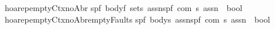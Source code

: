 \begin{isabellebody}
\isanewline
{\isachardoublequoteopen}{\isacharunderscore}hoarep{\isacharunderscore}emptyCtx{\isacharunderscore}noAbr{\isachardoublequoteclose}{\isacharcolon}{\isacharcolon}\isanewline
{\isachardoublequoteopen}{\isacharbrackleft}{\isacharparenleft}{\isacharprime}s{\isacharcomma}{\isacharprime}p{\isacharcomma}{\isacharprime}f{\isacharparenright}\ body{\isacharcomma}{\isacharprime}f\ set{\isacharcomma}{\isacharprime}s\ assn{\isacharcomma}{\isacharparenleft}{\isacharprime}s{\isacharcomma}{\isacharprime}p{\isacharcomma}{\isacharprime}f{\isacharparenright}\ com{\isacharcomma}\ {\isacharprime}s\ assn{\isacharbrackright}\ {\isacharequal}{\isachargreater}\ bool{\isachardoublequoteclose}\isanewline
\ \ \ {\isacharparenleft}{\isachardoublequoteopen}{\isacharparenleft}{}{\isacharunderscore}{\isacharslash}{\isacharbar}{\isacharminus}{\isacharprime}{\isacharslash}{\isacharunderscore}\ {\isacharparenleft}{\isacharunderscore}{\isacharslash}\ {\isacharparenleft}{\isacharunderscore}{\isacharparenright}{\isacharslash}\ {\isacharunderscore}{\isacharparenright}{\isacharparenright}{\isachardoublequoteclose}\ {\isacharbrackleft}{}{}{\isacharcomma}{}{}{\isacharcomma}{}{}{}{}{\isacharcomma}{}{}{\isacharcomma}{}{}{}{}{\isacharbrackright}{}{}{\isacharparenright}\isanewline
\isanewline
{\isachardoublequoteopen}{\isacharunderscore}hoarep{\isacharunderscore}emptyCtx{\isacharunderscore}noAbr{\isacharunderscore}emptyFaults{\isachardoublequoteclose}{\isacharcolon}{\isacharcolon}\isanewline
{\isachardoublequoteopen}{\isacharbrackleft}{\isacharparenleft}{\isacharprime}s{\isacharcomma}{\isacharprime}p{\isacharcomma}{\isacharprime}f{\isacharparenright}\ body{\isacharcomma}{\isacharprime}s\ assn{\isacharcomma}{\isacharparenleft}{\isacharprime}s{\isacharcomma}{\isacharprime}p{\isacharcomma}{\isacharprime}f{\isacharparenright}\ com{\isacharcomma}\ {\isacharprime}s\ assn{\isacharbrackright}\ {\isacharequal}{\isachargreater}\ bool{\isachardoublequoteclose}\isanewline
\ \ \ {\isacharparenleft}{\isachardoublequoteopen}{\isacharparenleft}{}{\isacharunderscore}{\isacharslash}{\isacharbar}{\isacharminus}{\isacharparenleft}{\isacharunderscore}{\isacharslash}\ {\isacharparenleft}{\isacharunderscore}{\isacharparenright}{\isacharslash}\ {\isacharunderscore}{\isacharparenright}{\isacharparenright}{\isachardoublequoteclose}\ {\isacharbrackleft}{}{}{\isacharcomma}{}{}{}{}{\isacharcomma}{}{}{\isacharcomma}{}{}{}{}{\isacharbrackright}{}{}{\isacharparenright}\isanewline

\end{isabellebody}

